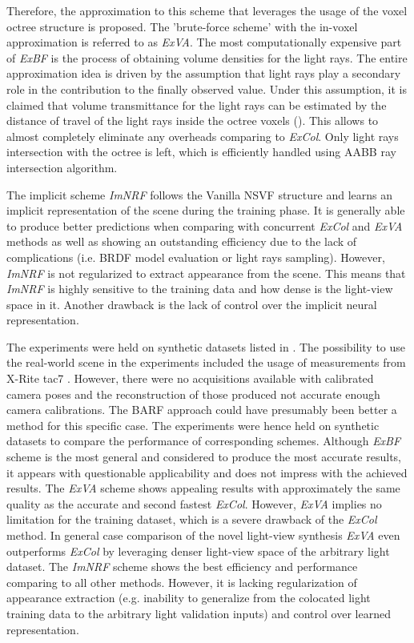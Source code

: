 Therefore, the approximation to this scheme that leverages the usage of the voxel octree structure is proposed.
The 'brute-force scheme' with the in-voxel approximation is referred to as \textit{ExVA}.
The most computationally expensive part of \textit{ExBF} is the process of
obtaining volume densities for the light rays.
The entire approximation idea is driven by the assumption
that light rays play a secondary role in the contribution to the finally observed value.
Under this assumption, it is claimed that volume transmittance for the light rays
can be estimated by the distance of travel of the light rays inside the octree voxels ().
This allows to almost completely eliminate any overheads comparing to \textit{ExCol}.
Only light rays intersection with the octree is left,
which is efficiently handled using AABB ray intersection algorithm.

The implicit scheme \textit{ImNRF} follows the Vanilla NSVF structure
and learns an implicit representation of the scene during the training phase.
It is generally able to produce better predictions
when comparing with concurrent \textit{ExCol} and \textit{ExVA} methods
as well as showing an outstanding efficiency due to the lack of complications
(i.e. BRDF model evaluation or light rays sampling).
However, \textit{ImNRF} is not regularized to extract appearance from the scene.
This means that \textit{ImNRF} is highly sensitive to the training data
and how dense is the light-view space in it.
Another drawback is the lack of control over the implicit neural representation.


The experiments were held on synthetic datasets listed in .
The possibility to use the real-world scene in the experiments included the usage of measurements from X-Rite tac7 \cite{merzbach2017highquality}.
However, there were no acquisitions available with calibrated camera poses
and the reconstruction of those produced not accurate enough camera calibrations.
The BARF approach \cite{lin2021barf} could have presumably been better a method for this specific case.
The experiments were hence held on synthetic datasets to compare the performance of corresponding schemes.
Although \textit{ExBF} scheme is the most general and considered to produce the most accurate results,
it appears with questionable applicability and does not impress with the achieved results.
The \textit{ExVA} scheme shows appealing results with approximately the same quality as the accurate and second fastest \textit{ExCol}.
However, \textit{ExVA} implies no limitation for the training dataset,
which is a severe drawback of the \textit{ExCol} method.
In general case comparison of the novel light-view synthesis \textit{ExVA} 
even outperforms \textit{ExCol} by leveraging denser light-view space of the arbitrary light dataset.
The \textit{ImNRF} scheme shows the best efficiency and performance
comparing to all other methods.
However, it is lacking regularization of appearance extraction
(e.g. inability to generalize from the colocated light training data to the arbitrary light validation inputs)
and control over learned representation.



